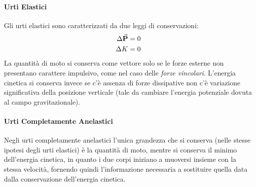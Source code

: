 \documentclass{report}
\newcommand{\note}{\noindent {\quad \bf \underline{Osservazione:}} \quad}
\renewcommand{\P}{\va{P}}
\begin{document}
\paragraph{Urti Elastici}
Gli urti elastici sono caratterizzati da due leggi di conservazioni:
\begin{align}
    \Delta\P=0\\
    \Delta K=0
\end{align}
\note La quantità di moto si conserva come vettore solo se le forze esterne non presentano carattere impulsivo, come nel caso delle \textit{forze vincolari}. L'energia cinetica si conserva invece se c'è assenza di forze dissipative non c'è variazione significativa della posizione verticale (tale da cambiare l'energia potenziale dovuta al campo gravitazionale). 
\paragraph{Urti Completamente Anelastici}
Negli urti completamente anelastici l'unica grandezza che si conserva (nelle stesse ipotesi degli urti elastici) è la quantità di moto, mentre si conserva il minimo dell'energia cinetica, in quanto i due corpi iniziano a muoversi insieme con la stessa velocità, fornendo quindi l'informazione necessaria a sostituire quella data dalla conservazione dell'energia cinetica. 
\end{document}
